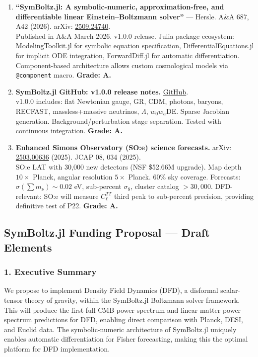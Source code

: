\documentclass[11pt,a4paper]{article}
\begin{document}
\begin{enumerate}
\item \textbf{``SymBoltz.jl: A symbolic-numeric, approximation-free, and differentiable linear Einstein--Boltzmann solver''} --- Hersle. A\&A 687, A42 (2026). arXiv: \href{https://arxiv.org/abs/2509.24740}{2509.24740}.\\
Published in A\&A March 2026. v1.0.0 release. Julia package ecosystem: ModelingToolkit.jl for symbolic equation specification, DifferentialEquations.jl for implicit ODE integration, ForwardDiff.jl for automatic differentiation. Component-based architecture allows custom cosmological models via \texttt{@component} macro. \textbf{Grade: A.}

\item \textbf{SymBoltz.jl GitHub: v1.0.0 release notes.} \href{https://github.com/hersle/SymBoltz.jl}{GitHub}.\\
v1.0.0 includes: flat Newtonian gauge, GR, CDM, photons, baryons, RECFAST, massless+massive neutrinos, $\Lambda$, $w_0w_a$DE. Sparse Jacobian generation. Background/perturbation stage separation. Tested with continuous integration. \textbf{Grade: A.}

\item \textbf{Enhanced Simons Observatory (SO:e) science forecasts.} arXiv: \href{https://arxiv.org/abs/2503.00636}{2503.00636} (2025). JCAP 08, 034 (2025).\\
SO:e LAT with 30,000 new detectors (NSF \$52.66M upgrade). Map depth $10\times$ Planck, angular resolution $5\times$ Planck. 60\% sky coverage. Forecasts: $\sigma(\sum m_\nu) \sim 0.02$ eV, sub-percent $\sigma_8$, cluster catalog $> 30{,}000$. DFD-relevant: SO:e will measure $C_\ell^{TT}$ third peak to sub-percent precision, providing definitive test of P22. \textbf{Grade: A.}
\end{enumerate}

\subsection{SymBoltz.jl Funding Proposal --- Draft Elements}

\subsubsection{1. Executive Summary}

We propose to implement Density Field Dynamics (DFD), a disformal scalar-tensor theory of gravity, within the SymBoltz.jl Boltzmann solver framework. This will produce the first full CMB power spectrum and linear matter power spectrum predictions for DFD, enabling direct comparison with Planck, DESI, and Euclid data. The symbolic-numeric architecture of SymBoltz.jl uniquely enables automatic differentiation for Fisher forecasting, making this the optimal platform for DFD implementation.
\end{document}
